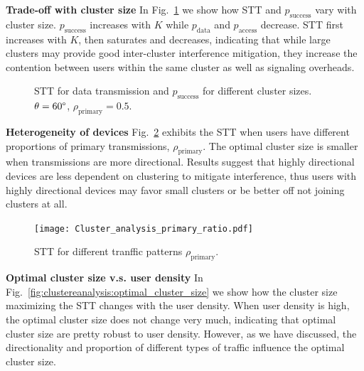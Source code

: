 \documentclass[10pt, conference, letterpaper]{IEEEtran}
\begin{document}
\textbf{Trade-off with cluster size} In Fig.~\ref{fig:clusteranalysis:basic} we show how STT and $p_{\mathrm{success}}$ vary with cluster size.  
$p_{\mathrm{success}}$ increases with $K$ while $p_{\mathrm{data}}$ and $p_{\mathrm{access}}$ decrease. 
STT first increases with $K$, then saturates and decreases, indicating that while large clusters may provide good inter-cluster interference mitigation, they increase the contention between users within the same cluster as well as signaling overheads. 

\begin{figure}[htp]
	\centering
	 \hfill
	
	\caption[]{STT for data transmission  and $p_{\mathrm{success}}$  for different cluster sizes. $\theta=60\degree$, $\rho_{\mathrm{primary}} = 0.5$. }
	\label{fig:clusteranalysis:basic}
\end{figure}

\textbf{Heterogeneity of devices} Fig.~\ref{fig:clusteranalysis:primary_ratio} exhibits the STT when users have different proportions of primary transmissions, $\rho_{\mathrm{primary}}$.
The optimal cluster size is smaller when transmissions are more directional. 
Results suggest that highly directional devices are less dependent on clustering to mitigate interference, thus users with highly directional devices may favor small clusters or be better off not joining clusters at all. 


\begin{figure}
	\centering
	\texttt{[image: Cluster\_analysis\_primary\_ratio.pdf]}
	\caption{STT for different tranffic patterns $\rho_{\mathrm{primary}}$.}
	\label{fig:clusteranalysis:primary_ratio}
\end{figure}

\textbf{Optimal cluster size v.s. user density} In Fig.~\ref{fig:clustereanalysis:optimal_cluster_size} we show how the cluster size maximizing the STT changes with the user density. 
When user density is high, the optimal cluster size does not change very much, indicating that optimal cluster size are pretty robust to user density. 
However, as we have discussed, the directionality and proportion of different types of traffic influence the optimal cluster size. 
\end{document}
